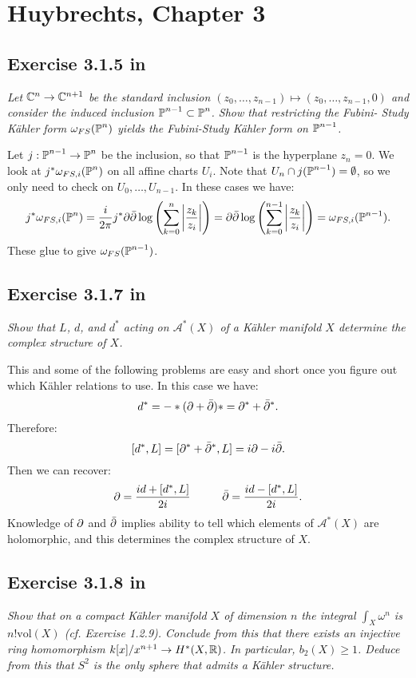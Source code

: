 \documentclass{article}
\begin{document}
\section{Huybrechts, Chapter 3}
\subsection*{Exercise 3.1.5 in \cite{Huy}}
\emph{Let $\mathbb{C}^n \to \mathbb{C}^{n+1}$ be the standard inclusion $(z_0,\dots, z_{n-1}) \mapsto (z_0,\dots,z_{n-1}, 0)$
and consider the induced inclusion $\operatorname{\mathbb{P}}^{n-1} \subset \operatorname{\mathbb{P}}^n$. Show that restricting the Fubini-
Study K\"{a}hler form $\omega_{FS}(\operatorname{\mathbb{P}}^n)$ yields the Fubini-Study K\"{a}hler form on $\operatorname{\mathbb{P}}^{n - 1}$.}
\vspace{3mm}

Let $j: \operatorname{\mathbb{P}}^{n-1} \to \operatorname{\mathbb{P}}^n$ be the inclusion, so that $\operatorname{\mathbb{P}}^{n-1}$ is the hyperplane $z_n = 0$. We look at $j^*\omega_{FS,i}
(\operatorname{\mathbb{P}}^n)$
on all affine charts $U_i$. Note that $U_n \cap j(\operatorname{\mathbb{P}}^{n-1}) = \emptyset$, so we only need to check 
on $U_0, \dots, U_{n-1}$. In these cases we have:
\[	j^* \omega_{FS,i}(\operatorname{\mathbb{P}}^n) = \frac{i}{2\pi}	j^* \partial \bar {\partial} \log \left( \sum_{k=0}^n \left| \frac{z_k}{z_i} \right| \right)
= \partial \bar {\partial} \log \left( \sum_{k=0}^{n-1} \left| \frac{z_k}{z_i} \right| \right) = \omega_{FS,i}(\operatorname{\mathbb{P}}^{n-1}). \]
These glue to give $\omega_{FS}(\operatorname{\mathbb{P}}^{n-1})$.


\subsection*{Exercise 3.1.7 in \cite{Huy}}
\emph{Show that $L$, $d$, and $d^*$ acting on $\mathcal{A}^*(X)$ of a K\"{a}hler manifold $X$ determine
the complex structure of $X$.}
\vspace{3mm}

This and some of the following problems are easy and short once you figure out which K\"{a}hler relations to use.
In this case we have:
\[	d^* = -* (\partial + \bar {\partial}) * = \partial^* + \bar {\partial}^*.	\]
Therefore:
\[	[d^*, L] = [\partial^* + \bar {\partial}^*, L] = i\partial - i \bar {\partial}.	\]
Then we can recover:
\[	\partial = \frac{id + [d^*,L]}{2i} \hspace{1cm} \bar {\partial} = \frac{id - [d^*,L]}{2i} .	\]
Knowledge of $\partial$ and $\bar {\partial}$ implies ability to tell which elements of $\mathcal{A}^*(X)$ are holomorphic, and this
determines the complex structure of $X$.



\subsection*{Exercise 3.1.8 in \cite{Huy}}
\emph{Show that on a compact K\"{a}hler manifold $X$ of dimension $n$ the integral
$\int_X \omega^n$ is $n! \text{vol}(X)$ (cf. Exercise 1.2.9). Conclude from this that there exists an
injective ring homomorphism $k[x]/x^{n+1} \to H^*(X,\mathbb{R})$. In particular, $b_2(X) \geq 1$.
Deduce from this that $S^2$ is the only sphere that admits a K\"{a}hler structure.}
\vspace{3mm}
\end{document}
